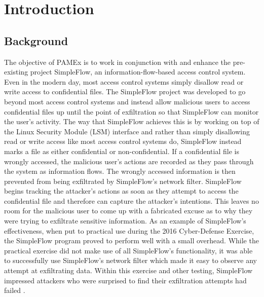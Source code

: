 \section{Introduction}

\label{sec:Introduction}
\vspace{\baselineskip}

\subsection{Background}
\par 
\vspace{\baselineskip}
\hspace{1em}
The objective of PAMEx is to work in conjunction with and enhance the 
pre-existing project SimpleFlow, an information-flow-based access 
control system. Even in the modern day, most access control systems 
simply disallow read or write access to confidential files. The 
SimpleFlow project was developed to go beyond most access control 
systems and instead allow malicious users to access confidential 
files up until the point of exfiltration so that SimpleFlow can monitor the user's activity. The way that 
SimpleFlow achieves this is by working on top of the Linux Security 
Module (LSM) interface and rather than simply disallowing read or write 
access like most access control systems do, SimpleFlow instead marks a 
file as either confidential or non-confidential. If a confidential 
file is wrongly accessed, the malicious user’s actions are recorded as they pass 
through the system as information flows. The wrongly accessed 
information is then prevented from being exfiltrated by SimpleFlow's network filter. 
SimpleFlow begins tracking the attacker’s actions as soon as they 
attempt to access the confidential file and therefore can capture the attacker’s 
intentions. This leaves no room for the malicious user to come up with 
a fabricated excuse as to why they were trying to exfiltrate sensitive 
information. As an example of SimpleFlow’s effectiveness, when put to 
practical use during the 2016 Cyber-Defense Exercise, the SimpleFlow 
program proved to perform well with a small overhead. While the 
practical exercise did not make use of all SimpleFlow’s functionality, 
it was able to successfully use SimpleFlow’s network filter which made 
it easy to observe any attempt at exfiltrating data. Within this 
exercise and other testing, SimpleFlow impressed attackers who were 
surprised to find their exfiltration attempts had failed \cite{ryan2016}. 

